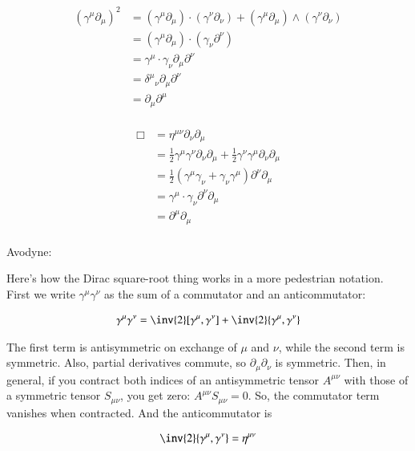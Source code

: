 \documentclass{article}
\begin{document}
%


\begin{align*}
(\gamma^\mu \partial_\mu)^2 
&= 
(\gamma^\mu \partial_\mu) \cdot (\gamma^\nu \partial_\nu)
+ (\gamma^\mu \partial_\mu) \wedge (\gamma^\nu \partial_\nu) \\
&= (\gamma^\mu \partial_\mu) \cdot (\gamma_\nu \partial^\nu) \\
&= \gamma^\mu \cdot \gamma_\nu \partial_\mu \partial^\nu \\
&= {\delta^\mu}_\nu \partial_\mu \partial^\nu \\
&= \partial_\mu \partial^\mu \\
\end{align*}


\begin{align*}
\Box
&= \eta ^{\mu\nu}\partial_{\nu}  \partial_{\mu}  \\
&= \frac{1}{2}\gamma^{\mu}\gamma^{\nu} \partial_{\nu}  \partial_{\mu} +\frac{1}{2}\gamma^{\nu}\gamma^{\mu} \partial_{\nu}  \partial_{\mu} \\
&= \frac{1}{2}\left(\gamma^{\mu}\gamma_{\nu} + \gamma_{\nu}\gamma^{\mu} \right) \partial^{\nu} \partial_{\mu} \\
&= \gamma^\mu \cdot \gamma_\nu \partial^{\nu} \partial_{\mu} \\
&= \partial^{\mu} \partial_{\mu} \\
\end{align*}


Avodyne:

Here's how the Dirac square-root thing works in a more pedestrian notation.  First we write $\gamma^\mu\gamma^\nu$ as the sum of a commutator and an anticommutator:

\begin{align*}
\gamma^\mu \gamma^\nu = \inv{2}[\gamma^\mu,\gamma^\nu] + \inv{2} \{\gamma^\mu,\gamma^\nu\}
\end{align*}

The first term is antisymmetric on exchange of $\mu$ and $\nu$, while the second term is symmetric.  Also, partial derivatives commute, so $\partial_\mu\partial_\nu$ is symmetric.  Then, in general, if you contract both indices of an antisymmetric tensor $A^{\mu\nu}$ with those of a symmetric tensor $S_{\mu\nu}$, you get zero: $A^{\mu\nu}S_{\mu\nu}=0$.  
So, the commutator term vanishes when contracted.  And the anticommutator is 

\begin{align*}
\inv{2}\{\gamma^\mu,\gamma^\nu\}=\eta^{\mu\nu}
\end{align*}



\end{document}
